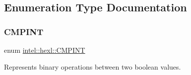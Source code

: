 \subsection{Enumeration Type Documentation}
\mbox{\label{namespaceintel_1_1hexl_abdcc9d2d5bb10fa95d5f143874508006}} 
\subsubsection{\texorpdfstring{C\+M\+P\+I\+NT}{CMPINT}}
{\footnotesize\ttfamily enum \hyperlink{namespaceintel_1_1hexl_abdcc9d2d5bb10fa95d5f143874508006}{intel\+::hexl\+::\+C\+M\+P\+I\+NT}\hspace{0.3cm}{\ttfamily [strong]}}



Represents binary operations between two boolean values. 


